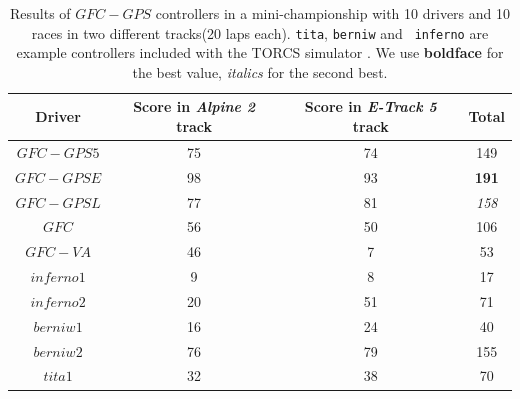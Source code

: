 \documentclass[10pt,journal,compsoc]{IEEEtran}
\begin{document}
\begin{table}[ht]
	\centering
	{\scriptsize
		\caption{ Results of $GFC-GPS$ controllers in a mini-championship with 10 drivers and 10
			races in two different tracks(20 laps each). {\tt tita}, {\tt berniw} and {\tt
				inferno} are example controllers included with the TORCS
			simulator \cite{torcs4}. We use {\bf boldface}
                      for the best value, {\em italics} for the second
                    best. }
		{
			\begin{tabular}{|c|c|c||c|}
				\hline
				Driver&Score in \textit{Alpine 2} track &Score in \textit{E-Track 5} track &Total\\
				\hline
				\hline
				
			$GFC-GPS5$&	75	&74&	149\\
			$GFC-GPSE$&	98	&93&	{\bf 191}\\
			$GFC-GPSL$&	77	&81&	{\em 158}\\
			$GFC$	&	56	&50&	106\\
			$GFC-VA$	&	46	&7&		53\\
			$inferno1$&	9	&8&		17\\
			$inferno2$&		20	&51&	71\\
			$berniw1$&	16	&24&	40\\
			$berniw2$&	76	&79&	155\\
			$tita1$&32	&38&	70\\		
				\hline
				
			\end{tabular}
		}\label{tab:RSresults}
	}
\end{table}
%
\end{document}
